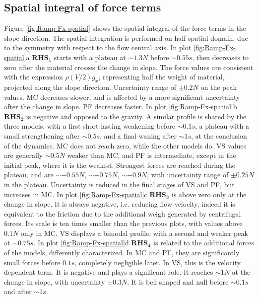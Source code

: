 \documentclass{article}
\begin{document}
\subsection{Spatial integral of force terms}
Figure \ref{fig:Ramp-Fx-spatial} shows the spatial integral of the force terms in the slope direction. The spatial integration is performed on half spatial domain, due to the symmetry with respect to the flow central axis. In plot \ref{fig:Ramp-Fx-spatial}a $\boldsymbol{RHS_1}$ starts with a plateau at $\sim 1.3 N$ before $\sim 0.55 s$, then decreases to zero after the material crosses the change in slope. The force values are consistent with the expression $\rho \left(V/2\right) g_x$, representing half the weight of material, projected along the slope direction. Uncertainty range of $\pm 0.2 N$ on the peak values. MC decreases slower, and is affected by a more significant uncertainty after the change in slope. PF decreases faster. In plot \ref{fig:Ramp-Fx-spatial}b $\boldsymbol{RHS_2}$ is negative and opposed to the gravity. A similar profile is shared by the three models, with a first short-lasting weakening before $\sim 0.1 s$, a plateau with a small strengthening after $\sim 0.5 s$, and a final waning after $\sim 1 s$, at the conclusion of the dynamics. MC does not reach zero, while the other models do. VS values are generally $\sim 0.5 N$ weaker than MC, and PF is intermediate, except in the initial peak, where it is the weakest. Strongest forces are reached during the plateau, and are $\sim -0.55 N$, $\sim -0.75 N$, $\sim -0.9 N$, with uncertainty range of $\pm 0.25 N$ in the plateau. Uncertainty is reduced in the final stages of VS and PF, but increases in MC. In plot \ref{fig:Ramp-Fx-spatial}c $\boldsymbol{RHS_3}$ is above zero only at the change in slope. It is always negative, i.e. reducing flow velocity, indeed it is equivalent to the friction due to the additional weigh generated by centrifugal forces. Its scale is ten times smaller than the previous plots, with values above $0.1 N$ only in MC. VS displays a bimodal profile, with a second and weaker peak at $\sim 0.75 s$. In plot \ref{fig:Ramp-Fx-spatial}d $\boldsymbol{RHS_4}$ is related to the additional forces of the models, differently characterized. In MC and PF, they are significantly small forces before $0.1 s$, completely negligible later. In VS, this is the velocity dependent term. It is negative and plays a significant role. It reaches $\sim 1 N$ at the change in slope, with uncertainty $\pm 0.3 N$. It is bell shaped and null before $\sim 0.1 s$ and after $\sim 1 s$.
\end{document}
